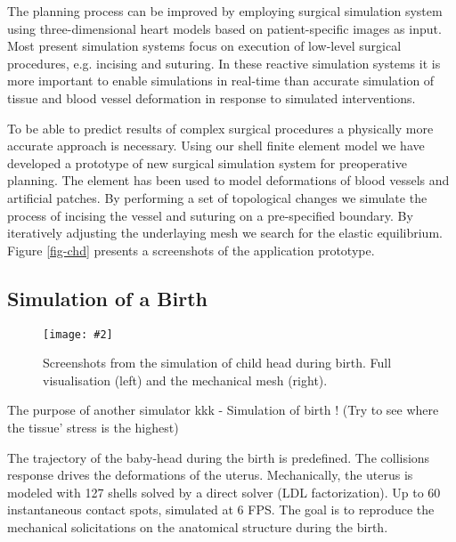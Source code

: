 \documentclass{egpubl}
\newcommand{\FigureW}[3]{%
\begin{figure*}[htb]
  \centering
  \texttt{[image: \#2]}
  \caption{\label{fig-#2}#3}
\end{figure*}}
\begin{document}
The planning process can be improved by employing surgical simulation system
using three-dimensional heart models based on patient-specific images as input.
Most present simulation systems focus on execution of low-level surgical
procedures, e.g. incising and suturing. In these reactive simulation systems it
is more important to enable simulations in real-time than accurate simulation
of tissue and blood vessel deformation in response to simulated interventions.

To be able to predict results of complex surgical procedures a physically more
accurate approach is necessary. Using our shell finite element model we have
developed a prototype \cite{Kislinskiy2012} of new surgical simulation system
for preoperative planning. The element has been used to model deformations of
blood vessels and artificial patches. By performing a set of topological changes
we simulate the process of incising the vessel and suturing on a pre-specified
boundary. By iteratively adjusting the underlaying mesh we search for the
elastic equilibrium. Figure \ref{fig-chd} presents a screenshots of the
application prototype.

%
%




\subsection{Simulation of a Birth}

\FigureW{\linewidth}{birth}
{Screenshots from the simulation of child head during birth. Full visualisation (left) and the mechanical mesh (right).}

The purpose of another simulator kkk 
- Simulation of birth ! (Try to see where the tissue' stress is the highest)


The trajectory of the baby-head during the birth is predefined. The collisions response drives the deformations of the uterus.
Mechanically, the uterus is modeled with 127 shells solved by a direct solver (LDL factorization).
Up to 60 instantaneous contact spots, simulated at 6 FPS.
The goal is to reproduce the mechanical solicitations on the anatomical structure during the birth.         
\end{document}
